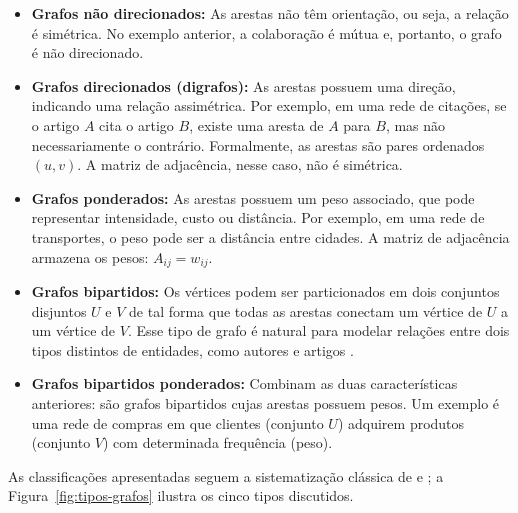 \begin{itemize}
    \item \textbf{Grafos não direcionados:} As arestas não têm
        orientação, ou seja, a relação é simétrica. No exemplo
        anterior, a colaboração é mútua e, portanto, o grafo é não
        direcionado.

    \item \textbf{Grafos direcionados (digrafos):} As arestas possuem
        uma direção, indicando uma relação assimétrica. Por exemplo,
        em uma rede de citações, se o artigo $A$ cita o artigo $B$,
        existe uma aresta de $A$ para $B$, mas não necessariamente o
        contrário. Formalmente, as arestas são pares ordenados
        $(u, v)$. A matriz de adjacência, nesse caso, não é simétrica.

    \item \textbf{Grafos ponderados:} As arestas possuem um peso
        associado, que pode representar intensidade, custo ou
        distância. Por exemplo, em uma rede de transportes, o peso
        pode ser a distância entre cidades. A matriz de adjacência
        armazena os pesos: $A_{ij} = w_{ij}$.

    \item \textbf{Grafos bipartidos:} Os vértices podem ser
        particionados em dois conjuntos disjuntos $U$ e $V$ de tal
        forma que todas as arestas conectam um vértice de $U$ a um
        vértice de $V$. Esse tipo de grafo é natural para modelar
        relações entre dois tipos distintos de entidades, como
        autores e artigos \parencite{newman2010}.

    \item \textbf{Grafos bipartidos ponderados:} Combinam as duas
        características anteriores: são grafos bipartidos cujas
        arestas possuem pesos. Um exemplo é uma rede de compras em
        que clientes (conjunto $U$) adquirem produtos (conjunto $V$)
        com determinada frequência (peso).
\end{itemize}

As classificações apresentadas seguem a sistematização clássica de
\citet{szwarcfiter2018} e \citet{newman2010}; a
Figura~\ref{fig:tipos-grafos} ilustra os cinco tipos discutidos.

